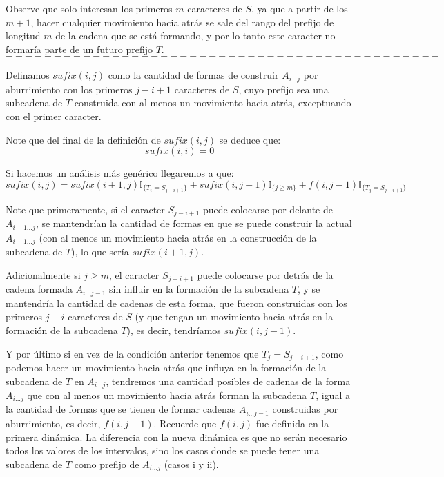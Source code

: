 \documentclass[a4paper]{article}
\begin{document}
    Observe que solo interesan los primeros $m$ caracteres de $S$, ya que a partir de los $m+1$,
    hacer cualquier movimiento hacia atr\'as se sale del rango del prefijo de longitud $m$ de la
    cadena que se est\'a formando, y por lo tanto este caracter no formar\'ia parte de un
    futuro prefijo $T$. \\

    

    
    
    $$---------------------------------------------$$
    
    Definamos $sufix(i,j)$ como la cantidad de formas de construir $A_{i...j}$ por aburrimiento con los primeros $j-i+1$ caracteres de $S$, cuyo prefijo sea una subcadena de $T$ construida con al menos un movimiento hacia atrás, exceptuando con el primer caracter.
    
    Note que del final de la definición de $sufix(i,j)$ se deduce que:
    $$sufix(i,i) = 0$$
    
    Si hacemos un análisis más genérico llegaremos a que:
    $$sufix(i,j) = sufix(i+1,j)\mathbb{I}_{ \{ T_i = S_{j-i+1} \}} + 
    sufix(i, j-1) \mathbb{I}_{ \{ j \ge m \}} + 
    f(i, j-1) \mathbb{I}_{ \{ T_j = S_{j-i+1}\}}$$
    
    Note que primeramente, si el caracter $S_{j-i+1}$ puede colocarse por delante de $A_{i+1...j}$, se mantendrían la cantidad de formas en que se puede construir la actual $A_{i+1...j}$ (con al menos un movimiento hacia atrás en la construcción de la subcadena de $T$), lo que sería $sufix(i+1,j)$.
    
    Adicionalmente si $j \ge m$, el caracter $S_{j-i+1}$ puede colocarse por detrás de la cadena formada $A_{i...j-1}$ sin influir en la formación de la subcadena $T$, y se mantendría la cantidad de cadenas de esta forma, que fueron construidas con los primeros $j-i$ caracteres de $S$ (y que tengan un movimiento hacia atrás en la formación de la subcadena $T$), es decir, tendríamos $sufix(i, j-1)$.
    
    Y por último si en vez de la condición anterior tenemos que $T_j = S_{j-i+1}$, como podemos hacer un movimiento hacia atrás que influya en la formación de la subcadena de $T$ en $A_{i...j}$, tendremos una cantidad posibles de cadenas de la forma $A_{i...j}$ que con al menos un movimiento hacia atrás forman la subcadena $T$, igual a la cantidad de formas que se tienen de formar cadenas $A_{i...j-1}$ construidas por aburrimiento, es decir, $f(i,j-1)$. Recuerde que $f(i,j)$ fue definida en la primera dinámica. La diferencia con la nueva dinámica es que no serán necesario todos los valores de los intervalos, sino los casos donde se puede tener una subcadena de $T$ como prefijo de $A_{i...j}$ (casos i y ii).
    
\end{document}
